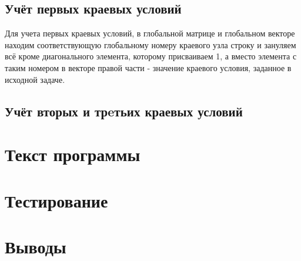 \documentclass[12pt,a4paper]{article}
\begin{document}
\subsection*{Учёт первых краевых условий}

Для учета первых краевых условий, в глобальной матрице
и глобальном векторе находим соответствующую глобальному
номеру краевого узла строку и зануляем всё кроме
диагонального элемента, которому присваиваем 1, а вместо
элемента с таким номером в векторе правой части - значение
краевого условия, заданное в исходной задаче.


\subsection*{Учёт вторых и трeтьих краевых условий}





\section{Текст программы}



\section{Тестирование}
\section{Выводы}










\end{document}
